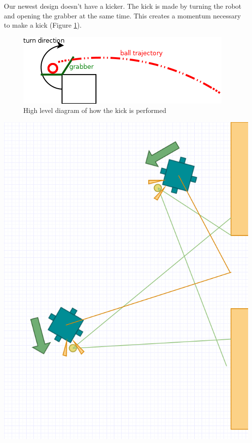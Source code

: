 \documentclass[a4paper,12pt]{article}
\begin{document}
Our newest design doesn't have a kicker. The kick is made by turning  the robot and opening the grabber at the same time. This creates a momentum necessary to make a kick (Figure \ref{fig:kick_action}). 
\begin{figure}
    \includegraphics[scale=.7]{kick}
    \caption{High level diagram of how the kick is performed}
    \label{fig:kick_action}
\end{figure}\newline
\includegraphics[scale=.5]{goodkick.png}\newline
\end{document}
